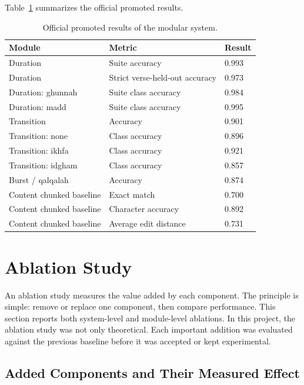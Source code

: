 \documentclass[12pt,a4paper]{report}
\begin{document}
Table~\ref{tab:official_results} summarizes the official promoted results.

\begin{table}[H]
\centering
\small
\begin{tabularx}{\textwidth}{p{} p{} X}
\toprule
\textbf{Module} & \textbf{Metric} & \textbf{Result} \\
\midrule
Duration & Suite accuracy & 0.993 \\
Duration & Strict verse-held-out accuracy & 0.973 \\
Duration: ghunnah & Suite class accuracy & 0.984 \\
Duration: madd & Suite class accuracy & 0.995 \\
Transition & Accuracy & 0.901 \\
Transition: none & Class accuracy & 0.896 \\
Transition: ikhfa & Class accuracy & 0.921 \\
Transition: idgham & Class accuracy & 0.857 \\
Burst / qalqalah & Accuracy & 0.874 \\
Content chunked baseline & Exact match & 0.700 \\
Content chunked baseline & Character accuracy & 0.892 \\
Content chunked baseline & Average edit distance & 0.731 \\
\bottomrule
\end{tabularx}
\caption{Official promoted results of the modular system.}
\label{tab:official_results}
\end{table}

\section{Ablation Study}

An ablation study measures the value added by each component. The principle is
simple: remove or replace one component, then compare performance. This section
reports both system-level and module-level ablations. In this project, the
ablation study was not only theoretical. Each important addition was evaluated
against the previous baseline before it was accepted or kept experimental.

\subsection{Added Components and Their Measured Effect}
\end{document}
